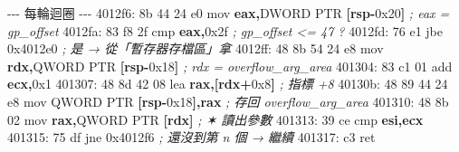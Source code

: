 \documentclass[10pt,a4paper]{article}
\newenvironment{Shaded}{\begin{snugshade}}{\end{snugshade}}
\newcommand{\BaseNTok}[1]{\textcolor[rgb]{0.00,0.00,0.81}{#1}}
\newcommand{\BuiltInTok}[1]{#1}
\newcommand{\CommentTok}[1]{\textcolor[rgb]{0.56,0.35,0.01}{\textit{#1}}}
\newcommand{\DataTypeTok}[1]{\textcolor[rgb]{0.13,0.29,0.53}{#1}}
\newcommand{\DecValTok}[1]{\textcolor[rgb]{0.00,0.00,0.81}{#1}}
\newcommand{\FloatTok}[1]{\textcolor[rgb]{0.00,0.00,0.81}{#1}}
\newcommand{\KeywordTok}[1]{\textcolor[rgb]{0.13,0.29,0.53}{\textbf{#1}}}
\newcommand{\NormalTok}[1]{#1}
\newcommand{\OperatorTok}[1]{\textcolor[rgb]{0.81,0.36,0.00}{\textbf{#1}}}
\renewenvironment{Shaded}{%
  \def\FrameCommand{\fboxsep=3.2pt\colorbox{shadecolor}}%
  \MakeFramed{\advance\hsize-\width\FrameRestore\small}%
}{%
  \endMakeFramed
}
\begin{document}
\begin{Shaded}
\begin{Highlighting}[]
\NormalTok{{-}{-}{-} 每輪迴圈 {-}{-}{-}}
\NormalTok{  4012f6: 8b 44 24 e0        mov    }\KeywordTok{eax}\OperatorTok{,}\DataTypeTok{DWORD} \DataTypeTok{PTR} \OperatorTok{[}\KeywordTok{rsp}\OperatorTok{{-}}\BaseNTok{0x20}\OperatorTok{]}  \CommentTok{; eax = gp\_offset}
\NormalTok{  4012fa: 83 f8 }\FloatTok{2}\BaseNTok{f}\NormalTok{           cmp    }\KeywordTok{eax}\OperatorTok{,}\BaseNTok{0x2f}                  \CommentTok{; gp\_offset \textless{}= 47 ?}
\NormalTok{  4012fd: 76 e1              jbe    }\BaseNTok{0x4012e0}                 \CommentTok{; 是 → 從「暫存器存檔區」拿}
\NormalTok{  4012ff: 48 8b 54 24 e8     mov    }\KeywordTok{rdx}\OperatorTok{,}\DataTypeTok{QWORD} \DataTypeTok{PTR} \OperatorTok{[}\KeywordTok{rsp}\OperatorTok{{-}}\BaseNTok{0x18}\OperatorTok{]}  \CommentTok{; rdx = overflow\_arg\_area}
\NormalTok{  401304: 83 c1 }\DecValTok{01}\NormalTok{           add    }\KeywordTok{ecx}\OperatorTok{,}\BaseNTok{0x1}
\NormalTok{  401307: 48 8d 42 08        }\BuiltInTok{lea}    \KeywordTok{rax}\OperatorTok{,[}\KeywordTok{rdx}\OperatorTok{+}\BaseNTok{0x8}\OperatorTok{]}             \CommentTok{; 指標 +8}
\NormalTok{  40130b: 48 89 44 24 e8     mov    }\DataTypeTok{QWORD} \DataTypeTok{PTR} \OperatorTok{[}\KeywordTok{rsp}\OperatorTok{{-}}\BaseNTok{0x18}\OperatorTok{],}\KeywordTok{rax}  \CommentTok{; 存回 overflow\_arg\_area}
\NormalTok{  401310: 48 8b 02           }\BuiltInTok{mov}    \KeywordTok{rax}\OperatorTok{,}\DataTypeTok{QWORD} \DataTypeTok{PTR} \OperatorTok{[}\KeywordTok{rdx}\OperatorTok{]}       \CommentTok{; ✶ 讀出參數}
\NormalTok{  401313: 39 ce              cmp    }\KeywordTok{esi}\OperatorTok{,}\KeywordTok{ecx}
\NormalTok{  401315: 75 }\DataTypeTok{df}\NormalTok{              jne    }\BaseNTok{0x4012f6}                  \CommentTok{; 還沒到第 n 個 → 繼續}
\NormalTok{  401317: c3                 ret}


\end{Highlighting}
\end{Shaded}
\end{document}
